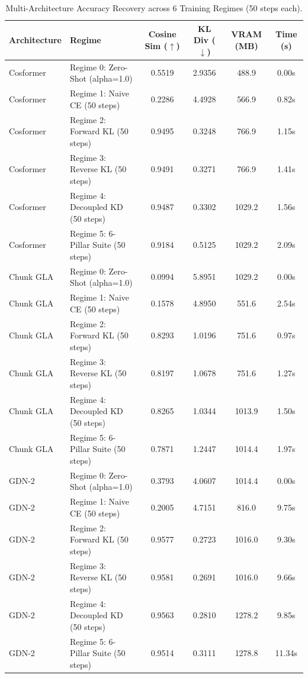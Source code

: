 \begin{table}[h]
\centering
\small
\caption{Multi-Architecture Accuracy Recovery across 6 Training Regimes (50 steps each).}
\label{tab:ablation_6pillar}
\begin{tabular}{llcccc}
\toprule
\textbf{Architecture} & \textbf{Regime} & \textbf{Cosine Sim ($\uparrow$)} & \textbf{KL Div ($\downarrow$)} & \textbf{VRAM (MB)} & \textbf{Time (s)} \\
\midrule
Cosformer & Regime 0: Zero-Shot (alpha=1.0) & 0.5519 & 2.9356 & 488.9 & 0.00s \\
Cosformer & Regime 1: Naive CE (50 steps) & 0.2286 & 4.4928 & 566.9 & 0.82s \\
Cosformer & Regime 2: Forward KL (50 steps) & 0.9495 & 0.3248 & 766.9 & 1.15s \\
Cosformer & Regime 3: Reverse KL (50 steps) & 0.9491 & 0.3271 & 766.9 & 1.41s \\
Cosformer & Regime 4: Decoupled KD (50 steps) & 0.9487 & 0.3302 & 1029.2 & 1.56s \\
Cosformer & Regime 5: 6-Pillar Suite (50 steps) & 0.9184 & 0.5125 & 1029.2 & 2.09s \\
Chunk GLA & Regime 0: Zero-Shot (alpha=1.0) & 0.0994 & 5.8951 & 1029.2 & 0.00s \\
Chunk GLA & Regime 1: Naive CE (50 steps) & 0.1578 & 4.8950 & 551.6 & 2.54s \\
Chunk GLA & Regime 2: Forward KL (50 steps) & 0.8293 & 1.0196 & 751.6 & 0.97s \\
Chunk GLA & Regime 3: Reverse KL (50 steps) & 0.8197 & 1.0678 & 751.6 & 1.27s \\
Chunk GLA & Regime 4: Decoupled KD (50 steps) & 0.8265 & 1.0344 & 1013.9 & 1.50s \\
Chunk GLA & Regime 5: 6-Pillar Suite (50 steps) & 0.7871 & 1.2447 & 1014.4 & 1.97s \\
GDN-2 & Regime 0: Zero-Shot (alpha=1.0) & 0.3793 & 4.0607 & 1014.4 & 0.00s \\
GDN-2 & Regime 1: Naive CE (50 steps) & 0.2005 & 4.7151 & 816.0 & 9.75s \\
GDN-2 & Regime 2: Forward KL (50 steps) & 0.9577 & 0.2723 & 1016.0 & 9.30s \\
GDN-2 & Regime 3: Reverse KL (50 steps) & 0.9581 & 0.2691 & 1016.0 & 9.66s \\
GDN-2 & Regime 4: Decoupled KD (50 steps) & 0.9563 & 0.2810 & 1278.2 & 9.85s \\
GDN-2 & Regime 5: 6-Pillar Suite (50 steps) & 0.9514 & 0.3111 & 1278.8 & 11.34s \\

\end{tabular}
\end{table}
